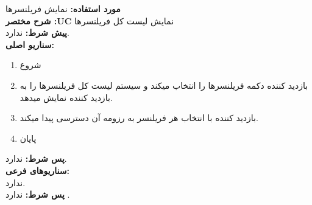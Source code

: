 \documentclass[20pt,a5paper]{report}
\begin{document}
\noindent \textbf{مورد استفاده:}
نمایش فریلنسرها
\\
\textbf{شرح مختصر :UC}
نمایش لیست کل فریلنسرها
\\
\textbf{پيش شرط:}
ندارد.
\\
\textbf{سناريو اصلی:}
\begin{enumerate}
\item
شروع
\item
بازدید کننده دکمه فریلنسرها را انتخاب میکند و سیستم لیست کل فریلنسرها را به بازدید کننده نمایش میدهد.
\item
بازدید کننده با انتخاب هر فریلنسر به رزومه آن دسترسی پیدا میکند.
\item
پایان
\end{enumerate}
\textbf{پس شرط:}
ندارد.
\\
\textbf{سناريوهای فرعی:}
\\
ندارد.
\\
\textbf{پس شرط:}
ندارد .


\centering
\vfill
\lr{\LaTeX}
\end{document}
